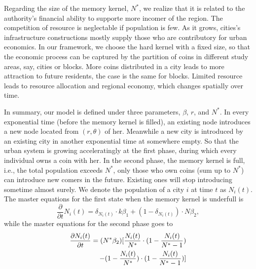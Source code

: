 \documentclass[reprint,unsortedaddress,amsmath,amssymb,aps,prl,showkeys]{revtex4-2}
\begin{document}
Regarding the size of the memory kernel, $N^*$, we realize that it is related to the authority's financial ability to supporte more incomer of the region. The competition of resource is neglectable if population is few. As it grows, cities's infrastructure constructions mostly supply those who are contributory for urban economics. In our framework, we choose the hard kernel with a fixed size, so that the economic process can be captured by the partition of coins in different study areas, say, cities or blocks. More coins distributed in a city leads to more attraction to future residents, the case is the same for blocks. Limited resource leads to resource allocation and regional economy, which changes spatially over time. 

In summary, our model is defined under three parameters, $\beta$, $r$, and $N^*$. In every exponential time (before the memory kernel is filled), an existing node introduces a new node located from $(r,\theta)$ of her. Meanwhile a new city is introduced by an existing city in another exponential time at somewhere empty. So that the urban system is growing acceleratingly at the first phase, during which every individual owns a coin with her. In the second phase, the memory kernel is full, i.e., the total population exceeds $N^*$, only those who own coins (sum up to $N^*$) can introduce new comers in the future. Existing ones will stop introducing sometime almost surely. We denote the population of a city $i$ at time $t$ as $N_i(t)$. The master equations for the first state when the memory kernel is underfull is \[\frac{\partial}{\partial t}N_i(t) =  \delta_{N_i(t)}\cdot k\beta_1+ (1-\delta_{N_i(t)})\cdot N\beta_2, \]while the master equations for the second phase goes to
\begin{align}
    \frac{\partial N_i(t)}{\partial t}  = (N^*\beta_2)[\frac{N_i(t)}{N^*}\cdot(1-\frac{N_i(t)}{N^*-1})& \notag\\  - (1-\frac{N_i(t)}{N^*})\cdot (1-\frac{N_i(t)}{N^*-1}) ]&
\end{align}
\end{document}
